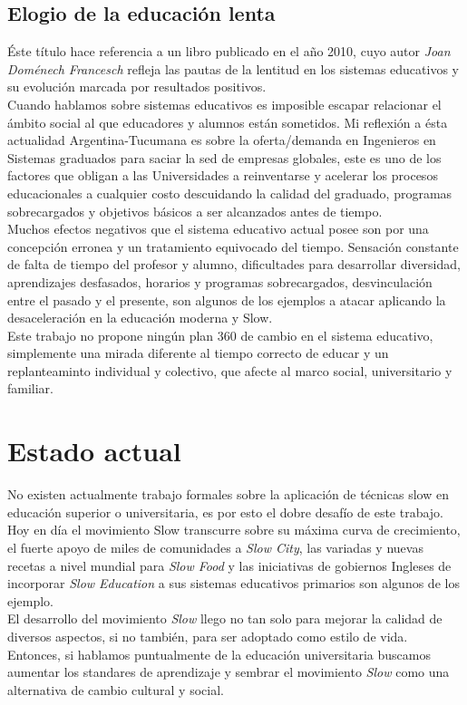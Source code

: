 \subsection{Elogio de la educaci\'on lenta}
\'Este t\'itulo hace referencia a un libro publicado en el a\~no 2010, cuyo autor \textit{Joan Dom\'enech Francesch} refleja las pautas de la lentitud en los 
sistemas educativos y su evoluci\'on marcada por resultados positivos.\\
Cuando hablamos sobre sistemas educativos es imposible escapar relacionar el \'ambito social al que educadores y alumnos est\'an sometidos. Mi reflexi\'on a 
\'esta actualidad Argentina-Tucumana es sobre la oferta/demanda en Ingenieros en Sistemas graduados para saciar la sed de empresas globales, este es uno de los factores
que obligan a las Universidades a reinventarse y acelerar los procesos educacionales a cualquier costo descuidando la calidad del graduado, programas sobrecargados
y objetivos b\'asicos a ser alcanzados antes de tiempo.\\
Muchos efectos negativos que el sistema educativo actual posee son por una concepci\'on erronea y un tratamiento equivocado del tiempo. Sensaci\'on constante
de falta de tiempo del profesor y alumno, dificultades para desarrollar diversidad, aprendizajes desfasados, horarios y programas sobrecargados, desvinculaci\'on
entre el pasado y el presente, son algunos de los ejemplos a atacar aplicando la desaceleraci\'on en la educaci\'on moderna y Slow.\\

Este trabajo no propone ning\'un plan 360 de cambio en el sistema educativo, simplemente una mirada diferente al tiempo correcto de educar y un replanteaminto 
individual y colectivo, que afecte al marco social, universitario y familiar.

\section{Estado actual}\label{ch1:opts}
No existen actualmente trabajo formales sobre la aplicaci\'on de t\'ecnicas slow en educaci\'on superior o universitaria, es por esto el dobre desaf\'io de este
trabajo.\\
Hoy en d\'ia el movimiento Slow transcurre sobre su m\'axima curva de crecimiento, el fuerte apoyo de miles de comunidades a \textit{Slow City}, las variadas y 
nuevas recetas a nivel mundial para \textit{Slow Food} y las iniciativas de gobiernos Ingleses de incorporar \textit{Slow Education} a sus sistemas educativos
primarios son algunos de los ejemplo.\\
El desarrollo del movimiento \textit{Slow} llego no tan solo para mejorar la calidad de diversos aspectos, si no tambi\'en, para ser adoptado como estilo de vida.
Entonces, si hablamos puntualmente de la educaci\'on universitaria buscamos aumentar los standares de aprendizaje y sembrar el movimiento \textit{Slow} como una
alternativa de cambio cultural y social.

